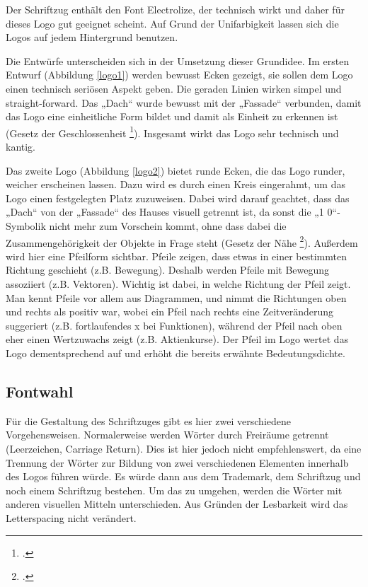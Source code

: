 Der Schriftzug enthält den Font Electrolize, der technisch wirkt und daher für dieses Logo gut geeignet scheint. Auf Grund der Unifarbigkeit lassen sich die Logos auf jedem Hintergrund benutzen.


Die Entwürfe unterscheiden sich in der Umsetzung dieser Grundidee. Im ersten Entwurf (Abbildung \ref{logo1}) werden bewusst Ecken gezeigt, sie sollen dem Logo einen technisch seriösen Aspekt geben. Die geraden Linien wirken simpel und straight-forward. Das „Dach“ wurde bewusst mit der „Fassade“ verbunden, damit das Logo eine einheitliche Form bildet und damit als Einheit zu erkennen ist (Gesetz der Geschlossenheit \footcite[vgl.][]{gestalt}). Insgesamt wirkt das Logo sehr technisch und kantig.


Das zweite Logo (Abbildung \ref{logo2}) bietet runde Ecken, die das Logo runder, weicher erscheinen lassen. Dazu wird es durch einen Kreis eingerahmt, um das Logo einen festgelegten Platz zuzuweisen. Dabei wird darauf geachtet, dass das „Dach“ von der „Fassade“ des Hauses visuell getrennt ist, da sonst die „1 0“-Symbolik nicht mehr zum Vorschein kommt, ohne dass dabei die Zusammengehörigkeit der Objekte in Frage steht (Gesetz der Nähe \footcite[vgl.][]{gestalt}). Außerdem wird hier eine Pfeilform sichtbar. Pfeile zeigen, dass etwas in einer bestimmten Richtung geschieht (z.B. Bewegung). Deshalb werden Pfeile mit Bewegung assoziiert (z.B. Vektoren). Wichtig ist dabei, in welche Richtung der Pfeil zeigt. Man kennt Pfeile vor allem aus Diagrammen, und nimmt die Richtungen oben und rechts als positiv war, wobei ein Pfeil nach rechts eine Zeitveränderung suggeriert (z.B. fortlaufendes x bei Funktionen), während der Pfeil nach oben eher einen Wertzuwachs zeigt (z.B. Aktienkurse). Der Pfeil im Logo wertet das Logo dementsprechend auf und erhöht die bereits erwähnte Bedeutungsdichte.

\subsection{Fontwahl}
Für die Gestaltung des Schriftzuges gibt es hier zwei verschiedene Vorgehensweisen. Normalerweise werden Wörter durch Freiräume getrennt (Leerzeichen, Carriage Return). Dies ist hier jedoch nicht empfehlenswert, da eine Trennung der Wörter zur Bildung von zwei verschiedenen Elementen innerhalb des Logos führen würde. Es würde dann aus dem Trademark, dem Schriftzug und noch einem Schriftzug bestehen. Um das zu umgehen, werden die Wörter mit anderen visuellen Mitteln unterschieden. Aus Gründen der Lesbarkeit wird das Letterspacing nicht verändert.

